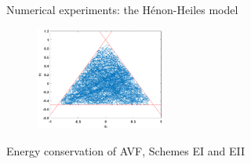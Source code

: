 \documentclass[10pt]{beamer}
\begin{document}
\begin{frame}{Numerical experiments: the H\'{e}non-Heiles model}
\begin{figure}
{\begin{minipage}[t]{0.33\textwidth}
\includegraphics[width=42mm]{cHH2_R}
\end{minipage}}
\end{figure}
\end{frame}

\begin{frame}{Energy conservation of AVF, Schemes EI and EII}
\begin{figure}
\centering
{}\vspace{-1mm}
\end{figure}
\end{frame}
\end{document}
